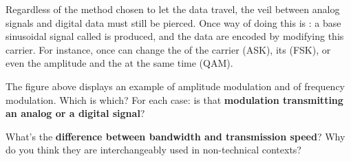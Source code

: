 Regardless of the method chosen to let the data travel, the veil between analog signals and digital data must still be 
pierced. Once way of doing this is : a base sinusoidal signal called  is produced,
and the data are encoded by modifying this carrier. For instance, once can change the  of the carrier (ASK),
its  (FSK), or even the amplitude and the  at the same time (QAM). 

\begin{exercise}
The figure above displays an example of amplitude modulation and of frequency modulation. 
Which is which? For each case: is that \textbf{modulation transmitting an analog or a digital signal}?
\end{exercise}


\begin{exercise}
What's the \textbf{difference between bandwidth and transmission speed}? 
Why do you think they are interchangeably used in non-technical contexts?
\end{exercise}
